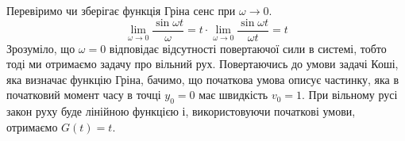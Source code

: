 Перевіримо чи зберігає функція Гріна сенс при $\omega \to 0$.
\begin{equation*}
    \lim_{\omega\to0} \frac{\sin\omega t}{\omega} = t \cdot \lim_{\omega\to0} \frac{\sin\omega t}{\omega t} = t
\end{equation*}
Зрозуміло, що $\omega = 0$ відповідає відсутності повертаючої сили в системі, тобто тоді ми отримаємо задачу про вільний рух. Повертаючись до умови задачі Коші, яка визначає функцію Гріна, бачимо, що початкова умова описує частинку, яка в початковий момент часу в точці $y_0 = 0$ має швидкість $v_0 = 1$. При вільному русі закон руху буде лінійною функцією і, використовуючи початкові умови, отримаємо $G(t) = t$. 

%